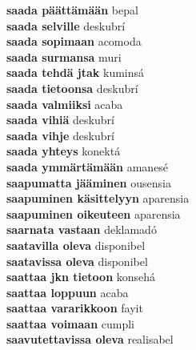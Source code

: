 \textbf{ saada päättämään  } bepal \\
\textbf{ saada selville  } deskubrí \\
\textbf{ saada sopimaan  } acomoda \\
\textbf{ saada surmansa  } muri \\
\textbf{ saada tehdä jtak  } kuminsá \\
\textbf{ saada tietoonsa  } deskubrí \\
\textbf{ saada valmiiksi  } acaba \\
\textbf{ saada vihiä  } deskubrí \\
\textbf{ saada vihje  } deskubrí \\
\textbf{ saada yhteys  } konektá \\
\textbf{ saada ymmärtämään  } amanesé \\
\textbf{ saapumatta jääminen  } ousensia \\
\textbf{ saapuminen käsittelyyn  } aparensia \\
\textbf{ saapuminen oikeuteen  } aparensia \\
\textbf{ saarnata vastaan  } deklamadó \\
\textbf{ saatavilla oleva  } disponibel \\
\textbf{ saatavissa oleva  } disponibel \\
\textbf{ saattaa jkn tietoon  } konsehá \\
\textbf{ saattaa loppuun  } acaba \\
\textbf{ saattaa vararikkoon  } fayit \\
\textbf{ saattaa voimaan  } cumpli \\
\textbf{ saavutettavissa oleva  } realisabel \\
